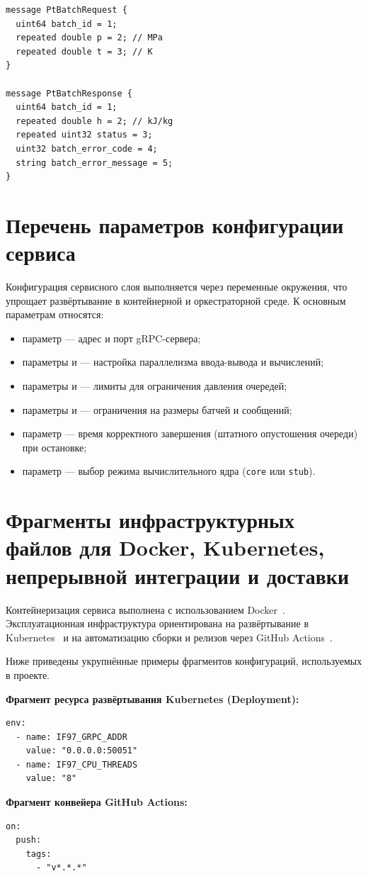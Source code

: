 \begin{appendices}
\begin{verbatim}
message PtBatchRequest {
  uint64 batch_id = 1;
  repeated double p = 2; // MPa
  repeated double t = 3; // K
}

message PtBatchResponse {
  uint64 batch_id = 1;
  repeated double h = 2; // kJ/kg
  repeated uint32 status = 3;
  uint32 batch_error_code = 4;
  string batch_error_message = 5;
}
\end{verbatim}

\section{Перечень параметров конфигурации сервиса}

Конфигурация сервисного слоя выполняется через переменные окружения, что упрощает развёртывание в контейнерной и оркестраторной среде.  
К основным параметрам относятся:
\begin{itemize}
\item параметр  --- адрес и порт gRPC-сервера;  
\item параметры  и  --- настройка параллелизма ввода-вывода и вычислений;  
\item параметры  и  --- лимиты для ограничения давления очередей;  
\item параметры  и  --- ограничения на размеры батчей и сообщений;  
\item параметр  --- время корректного завершения (штатного опустошения очереди) при остановке;  
\item параметр  --- выбор режима вычислительного ядра (\texttt{core} или \texttt{stub}).  
\end{itemize}

\section{Фрагменты инфраструктурных файлов для Docker, Kubernetes, непрерывной интеграции и доставки}

Контейнеризация сервиса выполнена с использованием Docker~\cite{docker_docs}.  
Эксплуатационная инфраструктура ориентирована на развёртывание в Kubernetes~\cite{kubernetes_docs} и на автоматизацию сборки и релизов через GitHub Actions~\cite{github_actions_docs}.  

Ниже приведены укрупнённые примеры фрагментов конфигураций, используемых в проекте.  

\textbf{Фрагмент ресурса развёртывания Kubernetes (Deployment):}
\begin{verbatim}
env:
  - name: IF97_GRPC_ADDR
    value: "0.0.0.0:50051"
  - name: IF97_CPU_THREADS
    value: "8"
\end{verbatim}

\textbf{Фрагмент конвейера GitHub Actions:}
\begin{verbatim}
on:
  push:
    tags:
      - "v*.*.*"
\end{verbatim}

\end{appendices}
